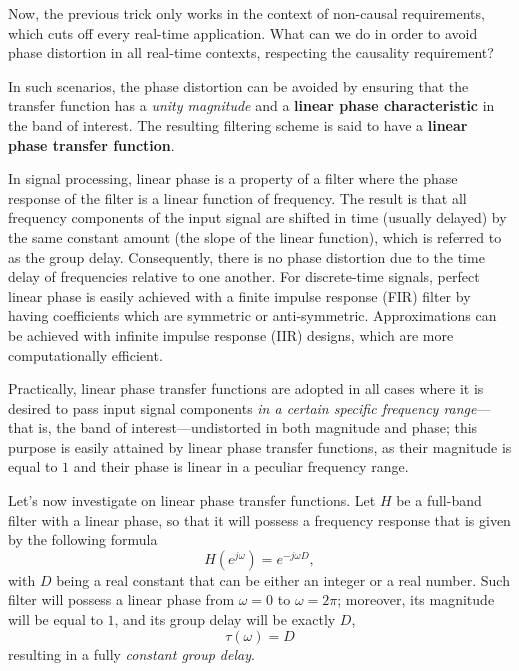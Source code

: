 \documentclass[\documentfontsize, twocolumn]{\classname}
\begin{document}
Now, the previous trick only works in the context of non-causal requirements, which cuts off every real-time application. What can we do in order to avoid phase distortion in all real-time contexts, respecting the causality requirement?

In such scenarios, the phase distortion can be avoided by ensuring that the transfer function
has a \emph{unity magnitude} and a \textbf{linear phase characteristic} in the band of interest. The resulting filtering scheme is said to have a \textbf{linear phase transfer function}.

In signal processing, linear phase is a property of a filter where the phase response of the filter is a linear function of frequency. The result is that all frequency components of the input signal are shifted in time (usually delayed) by the same constant amount (the slope of the linear function), which is referred to as the group delay. Consequently, there is no phase distortion due to the time delay of frequencies relative to one another. For discrete-time signals, perfect linear phase is easily achieved with a finite impulse response (FIR) filter by having coefficients which are symmetric or anti-symmetric. Approximations can be achieved with infinite impulse response (IIR) designs, which are more computationally efficient\cite{bib:linearPhase}.

Practically, linear phase transfer functions are adopted in all cases where it is desired to pass input signal components \emph{in a certain specific frequency range}---that is, the band of interest---undistorted in both magnitude and phase; this purpose is easily attained by linear phase transfer functions, as their magnitude is equal to $1$ and their phase is linear in a peculiar frequency range.

Let's now investigate on linear phase transfer functions. Let $H$ be a full-band filter with a linear phase, so that it will possess a frequency response that is given by the following formula
\begin{equation}\label{eqn:linearPhaseTransferFunction}
    H(e^{j\omega}) = e^{-j\omega D},
\end{equation}
with $D$ being a real constant that can be either an integer or a real number. Such filter will possess a linear phase from $\omega=0$ to $\omega=2\pi$; moreover, its magnitude will be equal to $1$, and its group delay will be exactly $D$,
\begin{equation}\label{eqn:linearPhaseTransferFunctionGroupDelay}
    \tau(\omega) = D
\end{equation}
resulting in a fully \emph{constant group delay}.
\end{document}
